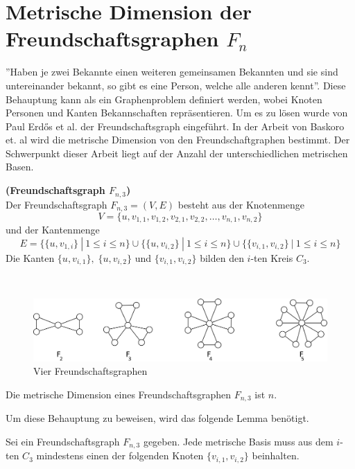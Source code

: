 \section{Metrische Dimension der Freundschaftsgraphen $F_{n}$}
\vspace{-3mm}
''Haben je zwei Bekannte einen weiteren gemeinsamen Bekannten und sie sind untereinander bekannt, so gibt es eine Person, welche alle anderen kennt''. Diese Behauptung kann als ein Graphenproblem definiert werden, wobei Knoten Personen und Kanten Bekannschaften repräsentieren. Um es zu lösen wurde von Paul Erdős et al. \cite{Erdos} der Freundschaftsgraph eingeführt. In der Arbeit von Baskoro et. al \cite{amal} wird die metrische Dimension von den Freundschaftgraphen bestimmt. Der Schwerpunkt dieser Arbeit liegt auf der Anzahl der unterschiedlichen metrischen Basen.
\begin{defi}{\textbf{(Freundschaftsgraph $F_{n,3}$)}}\\
Der Freundschaftsgraph $F_{n,3}=(V,E)$ besteht aus der Knotenmenge $$V = \{u,v_{1,1},v_{1,2},v_{2,1},v_{2,2},\ldots,v_{n,1},v_{n,2}\}$$ und der Kantenmenge $$E = \{ \{u,v_{1,i}\}~|~ 1 \leq i \leq n \} \cup \{ \{u,v_{i,2}\}~|~ 1 \leq i \leq n \} \cup \{ \{ v_{i,1}, v_{i,2} \} ~|~ 1 \leq i \leq n \}$$
Die Kanten $\{u,v_{i,1}\},\;\{u,v_{i,2}\}$ und $\{v_{i,1},v_{i,2}\}$ bilden den $i$-ten Kreis $C_3$.
\end{defi}
\begin{bsp}~
\vspace{-4mm}
\begin{figure}[h!]
\centering
 		 \includegraphics[width=360pt]{bilder/freunschaftsgraph.pdf}
   \caption{Vier Freundschaftsgraphen}
   \label{bild:fg}
\end{figure}
\vspace{-3mm}
\end{bsp}
\begin{lem}
\label{Freundschaftsgraphen}
Die metrische Dimension eines Freundschaftsgraphen $F_{n,3}$ ist $n$.
\end{lem}
\vspace{-2mm}
Um diese Behauptung zu beweisen, wird das folgende Lemma benötigt. 
\begin{lem}
\label{mindfreundschaftsgraph}
Sei ein Freundschaftsgraph $F_{n,3}$ gegeben. Jede metrische Basis muss aus dem $i$-ten $C_3$ mindestens einen der folgenden Knoten $\{v_{i,1},v_{i,2}\}$ beinhalten. 
\end{lem}
